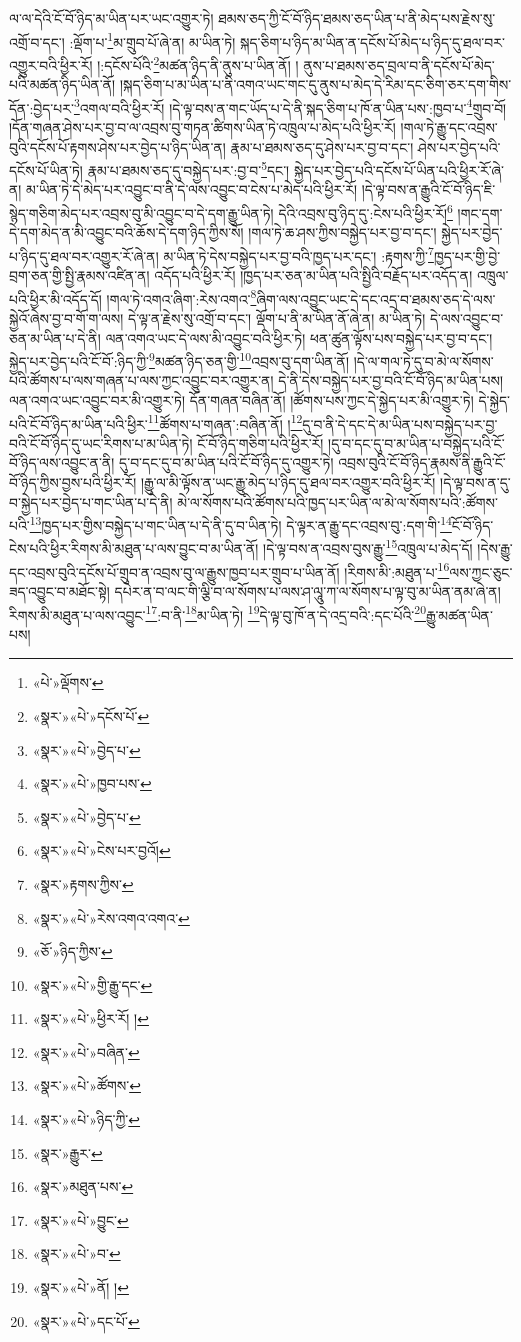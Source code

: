ལ་ལ་དེའི་ངོ་བོ་ཉིད་མ་ཡིན་པར་ཡང་འགྱུར་ཏེ། ཐམས་ཅད་ཀྱི་ངོ་བོ་ཉིད་ཐམས་ཅད་ཡིན་པ་ནི་མེད་པས་རྗེས་སུ་འགྲོ་བ་དང་། :ལྡོག་པ་\footnote{«པེ་»ལྡོགས་}མ་གྲུབ་པོ་ཞེ་ན། མ་ཡིན་ཏེ། སྐད་ཅིག་པ་ཉིད་མ་ཡིན་ན་དངོས་པོ་མེད་པ་ཉིད་དུ་ཐལ་བར་འགྱུར་བའི་ཕྱིར་རོ། །:དངོས་པོའི་\footnote{«སྣར་»«པེ་»དངོས་པོ་}མཚན་ཉིད་ནི་ནུས་པ་ཡིན་ནོ། །
ནུས་པ་ཐམས་ཅད་བྲལ་བ་ནི་དངོས་པོ་མེད་པའི་མཚན་ཉིད་ཡིན་ནོ། །སྐད་ཅིག་པ་མ་ཡིན་པ་ནི་འགའ་ཡང་གང་དུ་ནུས་པ་མེད་དེ་རིམ་དང་ཅིག་ཅར་དག་གིས་དོན་:བྱེད་པར་\footnote{«སྣར་»«པེ་»བྱེད་པ་}འགལ་བའི་ཕྱིར་རོ། །དེ་ལྟ་བས་ན་གང་ཡོད་པ་དེ་ནི་སྐད་ཅིག་པ་ཁོ་ན་ཡིན་པས་:ཁྱབ་པ་\footnote{«སྣར་»«པེ་»ཁྱབ་པས་}གྲུབ་བོ། །དོན་གཞན་ཤེས་པར་བྱ་བ་ལ་འབྲས་བུ་གཏན་ཚིགས་ཡིན་ཏེ་འཁྲུལ་པ་མེད་པའི་ཕྱིར་རོ། །གལ་ཏེ་རྒྱུ་དང་འབྲས་བུའི་དངོས་པོ་རྟགས་ཤེས་པར་བྱེད་པ་ཉིད་ཡིན་ན། རྣམ་པ་ཐམས་ཅད་དུ་ཤེས་པར་བྱ་བ་དང་། ཤེས་པར་བྱེད་པའི་དངོས་པོ་ཡིན་ཏེ། རྣམ་པ་ཐམས་ཅད་དུ་བསྐྱེད་པར་:བྱ་བ་\footnote{«སྣར་»«པེ་»བྱེད་པ་}དང་། སྐྱེད་པར་བྱེད་པའི་དངོས་པོ་ཡིན་པའི་ཕྱིར་རོ་ཞེ་ན། མ་ཡིན་ཏེ་དེ་མེད་པར་འབྱུང་བ་ནི་དེ་ལས་འབྱུང་བ་ངེས་པ་མེད་པའི་ཕྱིར་རོ། །དེ་ལྟ་བས་ན་རྒྱུའི་ངོ་བོ་ཉིད་ཇི་སྙེད་གཅིག་མེད་པར་འབྲས་བུ་མི་འབྱུང་བ་དེ་དག་རྒྱུ་ཡིན་ཏེ། དེའི་འབྲས་བུ་ཉིད་དུ་:ངེས་པའི་ཕྱིར་རོ།\footnote{«སྣར་»«པེ་»ངེས་པར་བྱའོ།} །གང་དག་དེ་དག་མེད་ན་མི་འབྱུང་བའི་ཆོས་དེ་དག་ཉིད་ཀྱིས་སོ། །གལ་ཏེ་ཆ་ཤས་ཀྱིས་བསྐྱེད་པར་བྱ་བ་དང་། སྐྱེད་པར་བྱེད་པ་ཉིད་དུ་ཐལ་བར་འགྱུར་རོ་ཞེ་ན། མ་ཡིན་ཏེ་དེས་བསྐྱེད་པར་བྱ་བའི་ཁྱད་པར་དང་། :རྟགས་ཀྱི་\footnote{«སྣར་»རྟགས་ཀྱིས་}ཁྱད་པར་གྱི་བྱེ་བྲག་ཅན་གྱི་སྤྱི་རྣམས་འཛིན་ན། འདོད་པའི་ཕྱིར་རོ། །ཁྱད་པར་ཅན་མ་ཡིན་པའི་སྤྱིའི་བརྗོད་པར་འདོད་ན། འཁྲུལ་པའི་ཕྱིར་མི་འདོད་དོ། །གལ་ཏེ་འགའ་ཞིག་:རེས་འགའ་\footnote{«སྣར་»«པེ་»རེས་འགའ་འགའ་}ཞིག་ལས་འབྱུང་ཡང་དེ་དང་འདྲ་བ་ཐམས་ཅད་དེ་ལས་སྐྱེའོ་ཞེས་བྱ་བ་གོ་ག་ལས། དེ་ལྟ་ན་རྗེས་སུ་འགྲོ་བ་དང་། ལྡོག་པ་ནི་མ་ཡིན་ནོ་ཞེ་ན། མ་ཡིན་ཏེ། དེ་ལས་འབྱུང་བ་ཅན་མ་ཡིན་པ་དེ་ནི། ལན་འགའ་ཡང་དེ་ལས་མི་འབྱུང་བའི་ཕྱིར་ཏེ། ཕན་ཚུན་ལྟོས་པས་བསྐྱེད་པར་བྱ་བ་དང་། སྐྱེད་པར་བྱེད་པའི་ངོ་བོ་:ཉིད་ཀྱི་\footnote{«ཅོ་»ཉིད་ཀྱིས་}མཚན་ཉིད་ཅན་གྱི་\footnote{«སྣར་»«པེ་»གྱི་རྒྱུ་དང་}འབྲས་བུ་དག་ཡིན་ནོ། །དེ་ལ་གལ་ཏེ་དུ་བ་མེ་ལ་སོགས་པའི་ཚོགས་པ་ལས་གཞན་པ་ལས་ཀྱང་འབྱུང་བར་འགྱུར་ན། དེ་ནི་དེས་བསྐྱེད་པར་བྱ་བའི་ངོ་བོ་ཉིད་མ་ཡིན་པས། ལན་འགའ་ཡང་འབྱུང་བར་མི་འགྱུར་ཏེ། དོན་གཞན་བཞིན་ནོ། །ཚོགས་པས་ཀྱང་དེ་སྐྱེད་པར་མི་འགྱུར་ཏེ། དེ་སྐྱེད་པའི་ངོ་བོ་ཉིད་མ་ཡིན་པའི་ཕྱིར་\footnote{«སྣར་»«པེ་»ཕྱིར་རོ། །}ཚོགས་པ་གཞན་:བཞིན་ནོ། །\footnote{«སྣར་»«པེ་»བཞིན་}དུ་བ་ནི་དེ་དང་དེ་མ་ཡིན་པས་བསྐྱེད་པར་བྱ་བའི་ངོ་བོ་ཉིད་དུ་ཡང་རིགས་པ་མ་ཡིན་ཏེ། ངོ་བོ་ཉིད་གཅིག་པའི་ཕྱིར་རོ། །དུ་བ་དང་དུ་བ་མ་ཡིན་པ་བསྐྱེད་པའི་ངོ་བོ་ཉིད་ལས་འབྱུང་ན་ནི། དུ་བ་དང་དུ་བ་མ་ཡིན་པའི་ངོ་བོ་ཉིད་དུ་འགྱུར་ཏེ། འབྲས་བུའི་ངོ་བོ་ཉིད་རྣམས་ནི་རྒྱུའི་ངོ་བོ་ཉིད་ཀྱིས་བྱས་པའི་ཕྱིར་རོ། །རྒྱུ་ལ་མི་ལྟོས་ན་ཡང་རྒྱུ་མེད་པ་ཉིད་དུ་ཐལ་བར་འགྱུར་བའི་ཕྱིར་རོ། །དེ་ལྟ་བས་ན་དུ་བ་སྐྱེད་པར་བྱེད་པ་གང་ཡིན་པ་དེ་ནི། མེ་ལ་སོགས་པའི་ཚོགས་པའི་ཁྱད་པར་ཡིན་ལ་མེ་ལ་སོགས་པའི་:ཚོགས་པའི་\footnote{«སྣར་»«པེ་»ཚོགས་}ཁྱད་པར་གྱིས་བསྐྱེད་པ་གང་ཡིན་པ་དེ་ནི་དུ་བ་ཡིན་ཏེ། དེ་ལྟར་ན་རྒྱུ་དང་འབྲས་བུ་:དག་གི་\footnote{«སྣར་»«པེ་»ཉིད་ཀྱི་}ངོ་བོ་ཉིད་ངེས་པའི་ཕྱིར་རིགས་མི་མཐུན་པ་ལས་བྱུང་བ་མ་ཡིན་ནོ། །དེ་ལྟ་བས་ན་འབྲས་བུས་རྒྱུ་\footnote{«སྣར་»རྒྱུར་}འཁྲུལ་པ་མེད་དོ། །དེས་རྒྱུ་དང་འབྲས་བུའི་དངོས་པོ་གྲུབ་ན་འབྲས་བུ་ལ་རྒྱུས་ཁྱབ་པར་གྲུབ་པ་ཡིན་ནོ། །རིགས་མི་:མཐུན་པ་\footnote{«སྣར་»མཐུན་པས་}ལས་ཀྱང་ཅུང་ཟད་འབྱུང་བ་མཐོང་སྟེ། དཔེར་ན་བ་ལང་གི་ལྕི་བ་ལ་སོགས་པ་ལས་ཤ་ལཱུ་ཀ་ལ་སོགས་པ་ལྟ་བུ་མ་ཡིན་ནམ་ཞེ་ན། རིགས་མི་མཐུན་པ་ལས་འབྱུང་\footnote{«སྣར་»«པེ་»བྱུང་}:བ་ནི་\footnote{«སྣར་»«པེ་»བ་}མ་ཡིན་ཏེ། \footnote{«སྣར་»«པེ་»ནོ། ། }དེ་ལྟ་བུ་ཁོ་ན་དེ་འདྲ་བའི་:དང་པོའི་\footnote{«སྣར་»«པེ་»དང་པོ་}རྒྱུ་མཚན་ཡིན་པས། 
